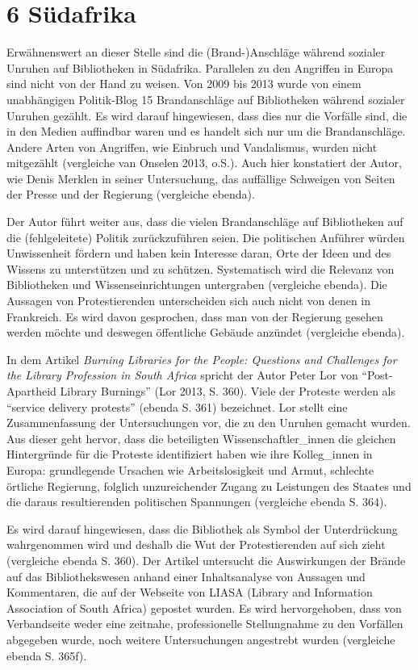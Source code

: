 \documentclass[a4paper,
fontsize=11pt,
oneside,
numbers=noperiodatend,
parskip=half-,
bibliography=totoc,
final
]{scrartcl}
\begin{document}
\hypertarget{suxfcdafrika}{%
\section{6 Südafrika}\label{suxfcdafrika}}

Erwähnenswert an dieser Stelle sind die (Brand-)Anschläge während
sozialer Unruhen auf Bibliotheken in Südafrika. Parallelen zu den
Angriffen in Europa sind nicht von der Hand zu weisen. Von 2009 bis 2013
wurde von einem unabhängigen Politik-Blog 15 Brandanschläge auf
Bibliotheken während sozialer Unruhen gezählt. Es wird darauf
hingewiesen, dass dies nur die Vorfälle sind, die in den Medien
auffindbar waren und es handelt sich nur um die Brandanschläge. Andere
Arten von Angriffen, wie Einbruch und Vandalismus, wurden nicht
mitgezählt (vergleiche van Onselen 2013, o.S.). Auch hier konstatiert
der Autor, wie Denis Merklen in seiner Untersuchung, das auffällige
Schweigen von Seiten der Presse und der Regierung (vergleiche ebenda).

Der Autor führt weiter aus, dass die vielen Brandanschläge auf
Bibliotheken auf die (fehlgeleitete) Politik zurückzuführen seien. Die
politischen Anführer würden Unwissenheit fördern und haben kein
Interesse daran, Orte der Ideen und des Wissens zu unterstützen und zu
schützen. Systematisch wird die Relevanz von Bibliotheken und
Wissenseinrichtungen untergraben (vergleiche ebenda). Die Aussagen von
Protestierenden unterscheiden sich auch nicht von denen in Frankreich.
Es wird davon gesprochen, dass man von der Regierung gesehen werden
möchte und deswegen öffentliche Gebäude anzündet (vergleiche ebenda).

In dem Artikel \emph{Burning Libraries for the People: Questions and
Challenges for the Library Profession in South Africa} spricht der Autor
Peter Lor von \enquote{Post-Apartheid Library Burnings} (Lor 2013, S.
360). Viele der Proteste werden als \enquote{service delivery protests}
(ebenda S. 361) bezeichnet. Lor stellt eine Zusammenfassung der
Untersuchungen vor, die zu den Unruhen gemacht wurden. Aus dieser geht
hervor, dass die beteiligten Wissenschaftler\_innen die gleichen
Hintergründe für die Proteste identifiziert haben wie ihre Kolleg\_innen
in Europa: grundlegende Ursachen wie Arbeitslosigkeit und Armut,
schlechte örtliche Regierung, folglich unzureichender Zugang zu
Leistungen des Staates und die daraus resultierenden politischen
Spannungen (vergleiche ebenda S. 364).

Es wird darauf hingewiesen, dass die Bibliothek als Symbol der
Unterdrückung wahrgenommen wird und deshalb die Wut der Protestierenden
auf sich zieht (vergleiche ebenda S. 360). Der Artikel untersucht die
Auswirkungen der Brände auf das Bibliothekswesen anhand einer
Inhaltsanalyse von Aussagen und Kommentaren, die auf der Webseite von
LIASA (Library and Information Association of South Africa) gepostet
wurden. Es wird hervorgehoben, dass von Verbandseite weder eine
zeitnahe, professionelle Stellungnahme zu den Vorfällen abgegeben wurde,
noch weitere Untersuchungen angestrebt wurden (vergleiche ebenda S.
365f).
\end{document}
